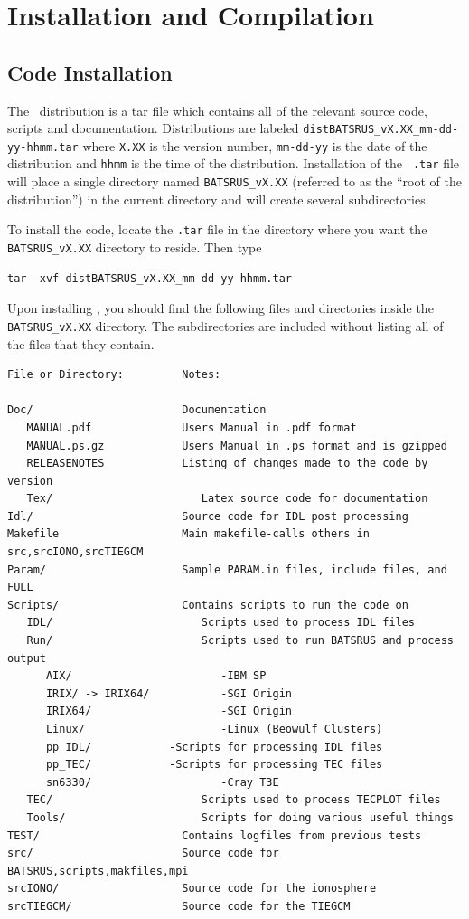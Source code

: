 \section{Installation and Compilation \label{section:install_compile}}

\subsection{Code Installation \label{section:install}}
The \BATSRUS\ distribution is a tar file which contains all of the
relevant source code, scripts and documentation.  Distributions are
labeled {\tt distBATSRUS\_vX.XX\_mm-dd-yy-hhmm.tar} where {\tt X.XX} is the
version number, {\tt mm-dd-yy} is the date of the distribution and
{\tt hhmm} is the time of the distribution.  Installation of the {\tt
.tar} file will place a single directory named {\tt BATSRUS\_vX.XX} (referred to
as the ``root of the distribution'') 
in the current directory and will create several subdirectories.

To install the code, locate the {\tt .tar} file in the directory 
where you want the {\tt BATSRUS\_vX.XX} directory to reside.  Then type
\begin{verbatim}
tar -xvf distBATSRUS_vX.XX_mm-dd-yy-hhmm.tar
\end{verbatim}

Upon installing \BATSRUS, you should find the following files
and directories inside the {\tt BATSRUS\_vX.XX} directory.  
The subdirectories are included without listing
all of the files that they contain.

\begin{verbatim}
File or Directory:         Notes:
			
Doc/                       Documentation 
   MANUAL.pdf              Users Manual in .pdf format
   MANUAL.ps.gz            Users Manual in .ps format and is gzipped
   RELEASENOTES            Listing of changes made to the code by version
   Tex/                       Latex source code for documentation
Idl/                       Source code for IDL post processing
Makefile                   Main makefile-calls others in src,srcIONO,srcTIEGCM
Param/                     Sample PARAM.in files, include files, and FULL
Scripts/                   Contains scripts to run the code on
   IDL/                       Scripts used to process IDL files
   Run/                       Scripts used to run BATSRUS and process output
      AIX/                       -IBM SP
      IRIX/ -> IRIX64/           -SGI Origin
      IRIX64/                    -SGI Origin
      Linux/                     -Linux (Beowulf Clusters)
      pp_IDL/			 -Scripts for processing IDL files
      pp_TEC/			 -Scripts for processing TEC files	
      sn6330/                    -Cray T3E
   TEC/                       Scripts used to process TECPLOT files
   Tools/                     Scripts for doing various useful things
TEST/                      Contains logfiles from previous tests
src/                       Source code for BATSRUS,scripts,makfiles,mpi
srcIONO/                   Source code for the ionosphere
srcTIEGCM/                 Source code for the TIEGCM
\end{verbatim}

